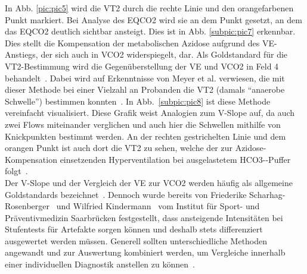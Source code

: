 In Abb. \ref{pic:pic5} wird die VT2 durch die rechte Linie und den orangefarbenen Punkt markiert. Bei Analyse des \gls{EQCO2} wird sie an dem Punkt gesetzt, an dem das \gls{EQCO2} deutlich sichtbar ansteigt. Dies ist in Abb. \ref{subpic:pic7} erkennbar. Dies stellt die Kompensation der metabolischen Azidose aufgrund des \gls{VE}-Anstiegs, der sich auch in \gls{VCO2} widerspiegelt, dar. Als Goldstandard für die VT2-Bestimmung wird die Gegenüberstellung der \gls{VE} und \gls{VCO2} in Feld 4 behandelt~\cite{ScharhagRosenberger.2013}. Dabei wird auf Erkenntnisse von Meyer et al. verwiesen, die mit dieser Methode bei einer Vielzahl an Probanden die VT2 (damals "`anaerobe Schwelle"') bestimmen konnten~\cite{Meyer.2005}. In Abb.~\ref{subpic:pic8} ist diese Methode vereinfacht visualisiert. Diese Grafik weist Analogien zum V-Slope auf, da auch zwei Flows miteinander verglichen und auch hier die Schwellen mithilfe von Knickpunkten bestimmt werden. An der rechten gestrichelten Linie und dem orangen Punkt ist auch dort die VT2 zu sehen, welche der zur Azidose-Kompensation einsetzenden Hyperventilation bei ausgelastetem \gls{HCO3-}-Puffer folgt~\cite{ScharhagRosenberger.2010}.\\
Der V-Slope und der Vergleich der \gls{VE} zur \gls{VCO2} werden häufig als allgemeine Goldstandards bezeichnet~\cite{ScharhagRosenberger.2013}. Dennoch wurde bereits von Friederike Scharhag-Rosenberger~\cite{ScharhagRosenberger.2010} und Wilfried Kindermann~\cite{Kindermann.2004} vom Institut für Sport- und Präventivmedizin Saarbrücken festgestellt, dass ansteigende Intensitäten bei Stufentests für Artefakte sorgen können und deshalb stets differenziert ausgewertet werden müssen. Generell sollten unterschiedliche Methoden angewandt und zur Auswertung kombiniert werden, um Vergleiche innerhalb einer individuellen Diagnostik anstellen zu können~\cite{ScharhagRosenberger.2010}.
%
